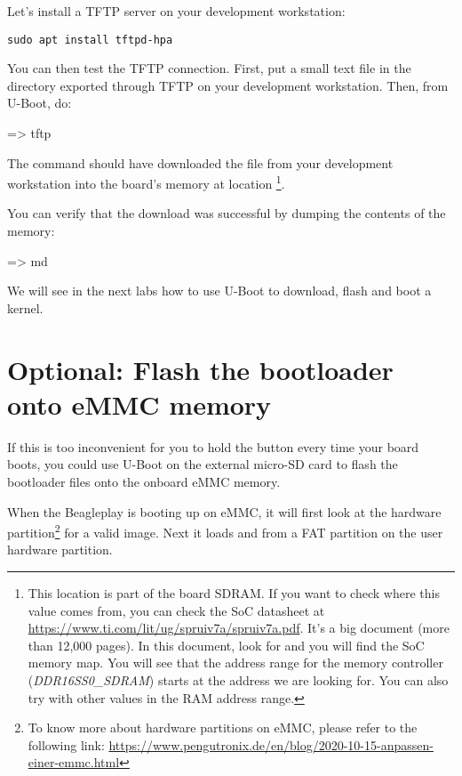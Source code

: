 Let's install a TFTP server on your development workstation:

\begin{verbatim}
sudo apt install tftpd-hpa
\end{verbatim}

You can then test the TFTP connection. First, put a small text file in
the directory exported through TFTP on your development
workstation. Then, from U-Boot, do:

\begin{ubootinput}
=> tftp %
\end{ubootinput}

The  command should have downloaded the
 file from your development workstation into
the board's memory at location {\tt \zimageboardaddr}\footnote{
This location is part of the board SDRAM. If you want
to check where this value comes from, you can check the SoC
datasheet at
\url{https://www.ti.com/lit/ug/spruiv7a/spruiv7a.pdf}.
It's a big document (more than 12,000 pages). In this document, look
for  and you will find the SoC memory map.
You will see that the address range for the memory controller
({\em DDR16SS0\_SDRAM})
starts at the address we are looking for.
You can also try with other values in the RAM address range.}.

You can verify that the download was successful by dumping the
contents of the memory:

\begin{ubootinput}
=> md %
\end{ubootinput}

We will see in the next labs how to use U-Boot to download, flash and
boot a kernel.

\section{Optional: Flash the bootloader onto eMMC memory}
If this is too inconvenient for you to hold the 
button every time your board boots, you could use U-Boot on the external
micro-SD card to flash the bootloader files onto the onboard eMMC memory.

When the Beagleplay is booting up on eMMC, it will first look at the
 hardware partition\footnote{To know more about hardware partitions
on eMMC, please refer to the following link:
\url{https://www.pengutronix.de/en/blog/2020-10-15-anpassen-einer-emmc.html}}
for a valid  image.
Next it loads  and  from a FAT partition on the
user hardware partition.

